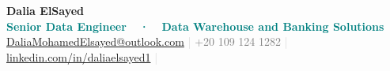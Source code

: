 \begin{center}
  {\fontsize{28}{32}\selectfont\textbf{\textcolor{darktext}{Dalia ElSayed}}}\\[4pt]
  {\normalsize\textbf{\textcolor{teal}{%
    Senior Data Engineer\ \ ·\ \ Data Warehouse and Banking Solutions\ %
  }}}\\[6pt]
  {\small
    \textcolor{lightgray}{\faEnvelope}\enspace
    \href{mailto:DaliaMohamedElsayed@outlook.com}{DaliaMohamedElsayed@outlook.com}
    \quad\textcolor{lightgray}{|}\quad
    \textcolor{lightgray}{\faPhone}\enspace
    \textcolor{graytext}{+20 109 124 1282}
    \quad\textcolor{lightgray}{|}\quad
    \textcolor{lightgray}{\faLinkedin}\enspace
    \href{https://www.linkedin.com/in/daliaelsayed1}{linkedin.com/in/daliaelsayed1}
    \quad\textcolor{lightgray}{|}\quad
  }
\end{center}
\vspace{2pt}
